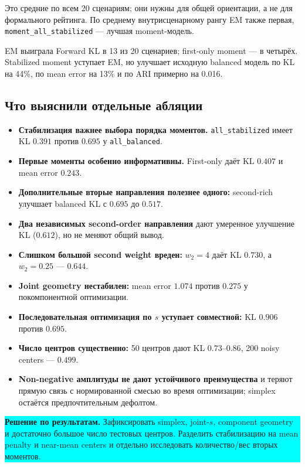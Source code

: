 \documentclass[11pt,a4paper]{article}
\newcommand{\code}[1]{{\footnotesize\nolinkurl{#1}}}
\newcommand{\decision}[1]{%
  \begin{center}
  \colorbox{cyan}{\parbox{0.94\linewidth}{%
    \textbf{\sffamily\color{navy}Решение по результатам.} #1}}
  \end{center}
}
\begin{document}
Это средние по всем 20 сценариям; они нужны для общей ориентации, а не для
формального рейтинга. По среднему внутрисценарному рангу EM также первая,
\code{moment_all_stabilized} --- лучшая moment-модель.

EM выиграла Forward KL в 13 из 20 сценариев; first-only moment ---
в четырёх. Stabilized moment уступает EM, но улучшает исходную balanced
модель по KL на 44\%, по mean error на 13\% и по ARI примерно на 0.016.

\subsection{Что выяснили отдельные абляции}

\begin{itemize}
  \item \textbf{Стабилизация важнее выбора порядка моментов.}
        \code{all_stabilized} имеет KL $0.391$ против $0.695$ у
        \code{all_balanced}.
  \item \textbf{Первые моменты особенно информативны.}
        First-only даёт KL $0.407$ и mean error $0.243$.
  \item \textbf{Дополнительные вторые направления полезнее одного:}
        second-rich улучшает balanced KL с $0.695$ до $0.517$.
  \item \textbf{Два независимых second-order направления} дают умеренное
        улучшение KL ($0.612$), но не меняют общий вывод.
  \item \textbf{Слишком большой second weight вреден:}
        $w_2=4$ даёт KL $0.730$, а $w_2=0.25$ --- $0.644$.
  \item \textbf{Joint geometry нестабилен:} mean error $1.074$ против
        $0.275$ у покомпонентной оптимизации.
  \item \textbf{Последовательная оптимизация по $s$ уступает совместной:}
        KL $0.906$ против $0.695$.
  \item \textbf{Число центров существенно:} 50 центров дают KL
        $0.73$--$0.86$, 200 noisy centers --- $0.499$.
  \item \textbf{Non-negative амплитуды не дают устойчивого преимущества}
        и теряют прямую связь с нормированной смесью во время оптимизации;
        simplex остаётся предпочтительным дефолтом.
\end{itemize}

\decision{Зафиксировать simplex, joint-$s$, component geometry и достаточно
большое число тестовых центров. Разделить стабилизацию на mean penalty и
near-mean centers и отдельно исследовать количество/вес вторых моментов.}
\end{document}
